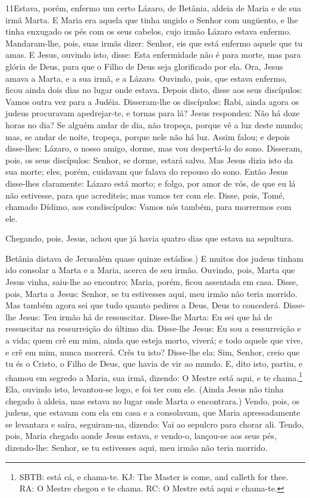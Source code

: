 \lettrine{11} Estava, porém, enfermo um certo Lázaro, de
Betânia, aldeia de Maria e de sua irmã Marta. E Maria era aquela
que tinha ungido o Senhor com ungüento, e lhe tinha enxugado os pés
com os seus cabelos, cujo irmão Lázaro estava enfermo.
Mandaram-lhe, pois, suas irmãs dizer: Senhor, eis que está
enfermo aquele que tu amas. E Jesus, ouvindo isto, disse: Esta
enfermidade não é para morte, mas para glória de Deus, para que o
Filho de Deus seja glorificado por ela. Ora, Jesus amava a
Marta, e a sua irmã, e a Lázaro. Ouvindo, pois, que estava
enfermo, ficou ainda dois dias no lugar onde estava. Depois
disto, disse aos seus discípulos: Vamos outra vez para a Judéia.
Disseram-lhe os discípulos: Rabi, ainda agora os judeus
procuravam apedrejar-te, e tornas para lá? Jesus respondeu: Não
há doze horas no dia? Se alguém andar de dia, não tropeça, porque vê
a luz deste mundo; mas, se andar de noite, tropeça, porque
nele não há luz. Assim falou; e depois disse-lhes: Lázaro, o
nosso amigo, dorme, mas vou despertá-lo do sono. Disseram,
pois, os seus discípulos: Senhor, se dorme, estará salvo. Mas
Jesus dizia isto da sua morte; eles, porém, cuidavam que falava do
repouso do sono. Então Jesus disse-lhes claramente: Lázaro
está morto; e folgo, por amor de vós, de que eu lá não
estivesse, para que acrediteis; mas vamos ter com ele. Disse,
pois, Tomé, chamado Dídimo, aos condiscípulos: Vamos nós também,
para morrermos com ele.

Chegando, pois, Jesus, achou que já havia quatro dias que estava
na sepultura.

Betânia distava de Jerusalém quase quinze estádios.) E
muitos dos judeus tinham ido consolar a Marta e a Maria, acerca de
seu irmão. Ouvindo, pois, Marta que Jesus vinha, saiu-lhe ao
encontro; Maria, porém, ficou assentada em casa. Disse, pois,
Marta a Jesus: Senhor, se tu estivesses aqui, meu irmão não teria
morrido. Mas também agora sei que tudo quanto pedires a Deus,
Deus to concederá. Disse-lhe Jesus: Teu irmão há de
ressuscitar. Disse-lhe Marta: Eu sei que há de ressuscitar na
ressurreição do último dia. Disse-lhe Jesus: Eu sou a
ressurreição e a vida; quem crê em mim, ainda que esteja morto,
viverá; e todo aquele que vive, e crê em mim, nunca morrerá.
Crês tu isto? Disse-lhe ela: Sim, Senhor, creio que tu és o
Cristo, o Filho de Deus, que havia de vir ao mundo. E, dito
isto, partiu, e chamou em segredo a Maria, sua irmã, dizendo: O
Mestre está aqui, e te chama.\footnote{SBTB: está cá, e chama-te.
KJ: The Master is come, and calleth for thee. RA: O Mestre chegou e
te chama. RC: O Mestre está aqui e chama-te.} Ela, ouvindo
isto, levantou-se logo, e foi ter com ele. (Ainda Jesus não
tinha chegado à aldeia, mas estava no lugar onde Marta o
encontrara.) Vendo, pois, os judeus, que estavam com ela em
casa e a consolavam, que Maria apressadamente se levantara e saíra,
seguiram-na, dizendo: Vai ao sepulcro para chorar ali. Tendo,
pois, Maria chegado aonde Jesus estava, e vendo-o, lançou-se aos
seus pés, dizendo-lhe: Senhor, se tu estivesses aqui, meu irmão não
teria morrido.

